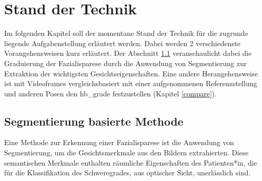 \chapter{Stand der Technik}\label{std}

Im folgenden Kapitel soll der momentane  Stand der Technik für die zugrunde liegende Aufgabenstellung erläutert werden. Dabei werden 2 verschiedenste Vorangehensweisen kurz erläutert. Der Abschnitt \ref{segmentation} veranschaulicht dabei die Graduierung der Fazialisparese durch die Anwendung von Segmentierung zur Extraktion der wichtigsten Gesichtseigenschaften. Eine andere Herangehensweise ist mit Videoframes vergleichsbasiert mit einer aufgenommenen Referenzstellung und anderen Posen den \ac{hb_grade} festzustellen (Kapitel \ref{compare}).

\section{Segmentierung basierte Methode}\label{segmentation}
Eine Methode zur Erkennung einer Fazialisparese ist die Anwendung von Segmentierung, um die Gesichtsmerkmale aus den Bildern extrahierten. Diese semantischen Merkmale enthalten räumliche Eigenschaften des Patienten*in, die für die Klassifikation des Schweregrades, aus optischer Sicht, unerlässlich sind.

